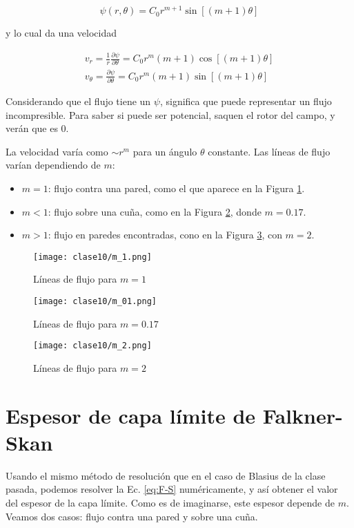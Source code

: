 \begin{equation}
\psi(r,\theta) = C_0 r^{m+1}\sin\left[(m+1)\theta\right]
\end{equation}

y lo cual da una velocidad

\begin{align}
v_r = \frac{1}{r}\frac{\partial\psi}{\partial\theta} = C_0 r^m(m+1)\cos[(m+1)\theta] \nonumber\\
v_\theta = \frac{\partial\psi}{\partial\theta} = C_0 r^m(m+1)\sin[(m+1)\theta]
\end{align}

Considerando que el flujo tiene un $\psi$, significa que puede representar un flujo incompresible.
Para saber si puede ser potencial, saquen el rotor del campo, y verán que es $0$.

La velocidad varía como $\sim r^m$ para un ángulo $\theta$ constante. 
Las líneas de flujo varían dependiendo de $m$:
%
\begin{itemize}
\item $m=1$: flujo contra una pared, como el que aparece en la Figura \ref{fig:m_1}.
\item $m<1$: flujo sobre una cuña, como en la Figura \ref{fig:m_01}, donde $m=0.17$.
\item $m>1$: flujo en paredes encontradas, cono en la Figura \ref{fig:m_2}, con $m=2$.
\end{itemize}

\begin{figure}
\centering
\texttt{[image: clase10/m\_1.png]}
\caption{Líneas de flujo para $m=1$}
\label{fig:m_1}
\end{figure}
%
\begin{figure}
\centering
\texttt{[image: clase10/m\_01.png]}
\caption{Líneas de flujo para $m=0.17$}
\label{fig:m_01}
\end{figure}
%
\begin{figure}
\centering
\texttt{[image: clase10/m\_2.png]}
\caption{Líneas de flujo para $m=2$}
\label{fig:m_2}
\end{figure}

\section*{Espesor de capa límite de Falkner-Skan}
Usando el mismo método de resolución que en el caso de Blasius de la clase pasada, podemos resolver la Ec. \eqref{eq:F-S} numéricamente, y así obtener el valor del espesor de la capa límite.
Como es de imaginarse, este espesor depende de $m$.
Veamos dos casos: flujo contra una pared y sobre una cuña.

